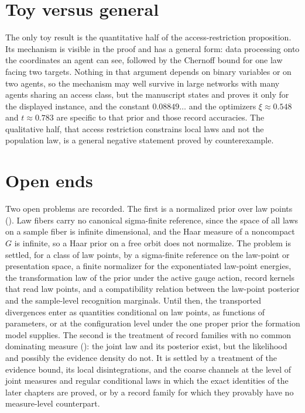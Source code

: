 \section{Toy versus general}
\label{comp:ch03-toy}

The only toy result is the quantitative half of the access-restriction proposition. Its mechanism is visible in
the proof and has a general form: data processing onto the coordinates an agent can see, followed by the Chernoff
bound for one law facing two targets. Nothing in that argument depends on binary variables or on two agents, so
the mechanism may well survive in large networks with many agents sharing an access class, but the manuscript
states and proves it only for the displayed instance, and the constant $0.08849\ldots$ and the optimizers
$\xi\approx0.548$ and $t\approx0.783$ are specific to that prior and those record accuracies. The qualitative
half, that access restriction constrains local laws and not the population law, is a general negative statement
proved by counterexample.

\section{Open ends}
\label{comp:ch03-open}

Two open problems are recorded. The first is a normalized prior over law points ().
Law fibers carry no canonical sigma-finite reference, since the space of all laws on a sample fiber is infinite
dimensional, and the Haar measure of a noncompact $G$ is infinite, so a Haar prior on a free orbit does not
normalize. The problem is settled, for a class of law points, by a sigma-finite reference on the law-point or
presentation space, a finite normalizer for the exponentiated law-point energies, the transformation law of the
prior under the active gauge action, record kernels that read law points, and a compatibility relation between
the law-point posterior and the sample-level recognition marginals. Until then, the transported divergences
 enter as quantities conditional on law points, as functions of
parameters, or at the configuration level under the one proper prior the formation model supplies. The second is the treatment of record families with no
common dominating measure (): the joint law and its posterior exist, but the
likelihood and possibly the evidence density do not. It is settled by a treatment of the evidence bound, its
local disintegrations, and the coarse channels at the level of joint measures and regular conditional laws in
which the exact identities of the later chapters are proved, or by a record family for which they provably have
no measure-level counterpart.

